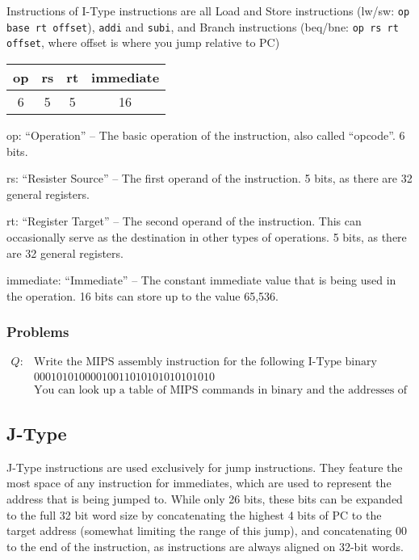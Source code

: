 \documentclass{article}
\begin{document}
Instructions of I-Type instructions are all Load and Store instructions (lw/sw: \texttt{op base rt offset}), \texttt{addi} and \texttt{subi}, and Branch instructions (beq/bne: \texttt{op rs rt offset}, where offset is where you jump relative to PC)

\begin{tabular}{| c | c | c | c |}
    \hline
        op & rs & rt & immediate \\
        \hline
        6 & 5 & 5 & 16 \\
    \hline
\end{tabular}

op: ``Operation'' -- The basic operation of the instruction, also called ``opcode''. 6 bits.

rs: ``Resister Source'' -- The first operand of the instruction. 5 bits, as there are 32 general registers. 

rt: ``Register Target'' -- The second operand of the instruction. This can occasionally serve as the destination in other types of operations. 5 bits, as there are 32 general registers. 

immediate: ``Immediate'' -- The constant immediate value that is being used in the operation. 16 bits can store up to the value 65,536.

\subsubsection{Problems}\label{ITypeProblems}

\begin{equation}\label{IType1}
\begin{aligned}
    Q: & \text{Write the MIPS assembly instruction for the following I-Type binary instruction:}\\
    & 00010101000010011010101010101010\\
    & \text{You can look up a table of MIPS commands in binary and the addresses of registers.}
\end{aligned}
\end{equation}


\subsection{J-Type}\label{JType}

J-Type instructions are used exclusively for jump instructions. They feature the most space of any instruction for immediates, which are used to represent the address that is being jumped to. While only 26 bits, these bits can be expanded to the full 32 bit word size by concatenating the highest 4 bits of PC to the target address (somewhat limiting the range of this jump), and concatenating 00 to the end of the instruction, as instructions are always aligned on 32-bit words. 
\end{document}
